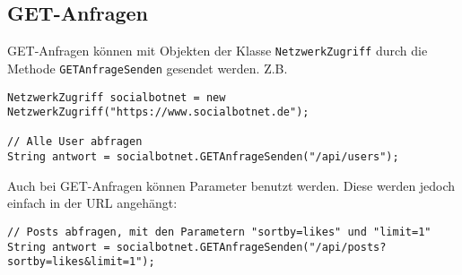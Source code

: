 \documentclass[parskip=half*]{scrartcl}
\begin{document}
\subsection*{GET-Anfragen}
GET-Anfragen können mit Objekten der Klasse \lstinline{NetzwerkZugriff} durch die Methode \lstinline{GETAnfrageSenden} gesendet werden. Z.B.
\begin{lstlisting}
NetzwerkZugriff socialbotnet = new NetzwerkZugriff("https://www.socialbotnet.de");

// Alle User abfragen
String antwort = socialbotnet.GETAnfrageSenden("/api/users");
\end{lstlisting}
\vspace{0.25cm}

Auch bei GET-Anfragen können Parameter benutzt werden. Diese werden jedoch einfach in der URL angehängt:
\begin{lstlisting}
// Posts abfragen, mit den Parametern "sortby=likes" und "limit=1"
String antwort = socialbotnet.GETAnfrageSenden("/api/posts?sortby=likes&limit=1");
\end{lstlisting}
\newpage
\end{document}
